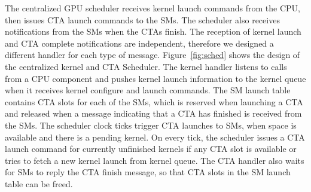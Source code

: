 The centralized GPU scheduler receives kernel launch commands from the CPU, then
issues CTA launch commands to the SMs. The scheduler also receives notifications
from the SMs when the CTAs finish. The reception of kernel launch and CTA
complete notifications are independent, therefore we designed a different
handler for each type of message. Figure~\ref{fig:sched} shows the design of the
centralized kernel and CTA Scheduler. The kernel handler listens to calls from a
CPU component and pushes kernel launch information to the kernel queue when it
receives kernel configure and launch commands. The SM launch table contains CTA
slots for each of the SMs, which is reserved when launching a CTA and released when a
message indicating that a CTA has finished is received from the SMs. The
scheduler clock ticks trigger CTA launches to SMs, when space is available and
there is a pending kernel. On every tick, the scheduler issues a CTA launch
command for currently unfinished kernels if any CTA slot is available or tries
to fetch a new kernel launch from kernel queue. The CTA handler also waits for
SMs to reply the CTA finish message, so that CTA slots in the SM launch table can
be freed.
